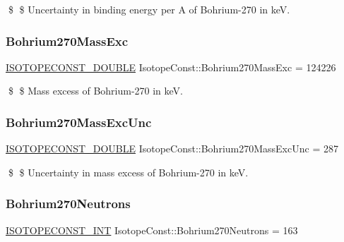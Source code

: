 \$ \$ Uncertainty in binding energy per A of Bohrium-\/270 in keV. \mbox{\label{group___isotope_const-_bohrium-_bh270_ga27c2001a9ba59b56cdc8dad2137ee1d8}} 
\subsubsection{\texorpdfstring{Bohrium270\+Mass\+Exc}{Bohrium270MassExc}}
{\footnotesize\ttfamily \mbox{\hyperlink{group___isotope_const-_macros_ga8f45a7272ce02c0b4c65c44636ed719a}{I\+S\+O\+T\+O\+P\+E\+C\+O\+N\+S\+T\+\_\+\+D\+O\+U\+B\+LE}} Isotope\+Const\+::\+Bohrium270\+Mass\+Exc = 124226}

\$ \$ Mass excess of Bohrium-\/270 in keV. \mbox{\label{group___isotope_const-_bohrium-_bh270_ga45ced8bb318a79077ca2812dddf8771b}} 
\subsubsection{\texorpdfstring{Bohrium270\+Mass\+Exc\+Unc}{Bohrium270MassExcUnc}}
{\footnotesize\ttfamily \mbox{\hyperlink{group___isotope_const-_macros_ga8f45a7272ce02c0b4c65c44636ed719a}{I\+S\+O\+T\+O\+P\+E\+C\+O\+N\+S\+T\+\_\+\+D\+O\+U\+B\+LE}} Isotope\+Const\+::\+Bohrium270\+Mass\+Exc\+Unc = 287}

\$ \$ Uncertainty in mass excess of Bohrium-\/270 in keV. \mbox{\label{group___isotope_const-_bohrium-_bh270_gaf7cea4c9930683b8025981accc01db40}} 
\subsubsection{\texorpdfstring{Bohrium270\+Neutrons}{Bohrium270Neutrons}}
{\footnotesize\ttfamily \mbox{\hyperlink{group___isotope_const-_macros_ga5f18360b3e99483a35c32d789e62621c}{I\+S\+O\+T\+O\+P\+E\+C\+O\+N\+S\+T\+\_\+\+I\+NT}} Isotope\+Const\+::\+Bohrium270\+Neutrons = 163}

